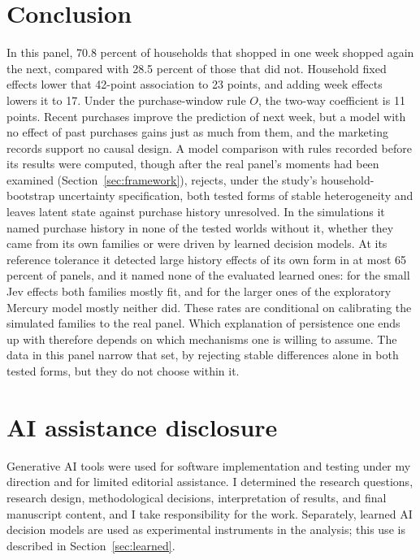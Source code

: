 \documentclass[11pt]{article}
\begin{document}
\section{Conclusion}
\label{sec:conclusion}

In this panel, 70.8 percent of households that shopped in one week shopped again the next,
compared with 28.5 percent of those that did not. Household fixed effects lower that 42-point
association to 23 points, and adding week effects lowers it to 17. Under the purchase-window
rule $O$, the two-way coefficient is 11 points. Recent
purchases improve the prediction of next week, but a model with no effect of past purchases
gains just as much from them, and the marketing records support no causal design. A model
comparison with rules recorded before its results were computed, though after the real panel's
moments had been examined (Section~\ref{sec:framework}),
rejects, under the study's household-bootstrap uncertainty specification, both tested forms of
stable heterogeneity and leaves latent state against purchase history unresolved. In the simulations it named purchase history in none
of the tested worlds without it, whether they came from its own families or were driven by
learned decision models. At its reference
tolerance it detected large history effects of its own form in at most 65 percent of panels,
and it named none of the evaluated learned ones: for the small Jev effects both families mostly fit,
and for the larger ones of the exploratory Mercury model mostly neither did. These rates are
conditional on calibrating the simulated families to the real panel. Which explanation of persistence one ends up with therefore
depends on which mechanisms one is willing to assume. The data in this panel narrow that set,
by rejecting stable differences alone in both tested forms, but they do not choose within it.

\section*{AI assistance disclosure}

Generative AI tools were used for software implementation and testing under my direction and for
limited editorial assistance. I determined the research questions, research design,
methodological decisions, interpretation of results, and final manuscript content, and I take
responsibility for the work. Separately, learned AI decision models are used as experimental
instruments in the analysis; this use is described in Section~\ref{sec:learned}.
\end{document}
